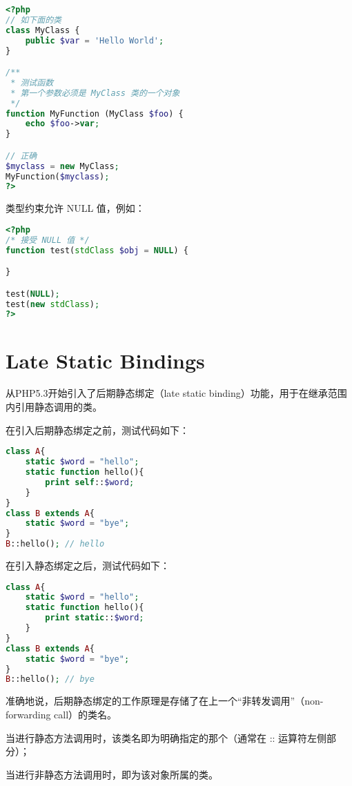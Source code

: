\begin{lstlisting}[language=PHP]
<?php
// 如下面的类
class MyClass {
    public $var = 'Hello World';
}

/**
 * 测试函数
 * 第一个参数必须是 MyClass 类的一个对象
 */
function MyFunction (MyClass $foo) {
    echo $foo->var;
}

// 正确
$myclass = new MyClass;
MyFunction($myclass);
?>
\end{lstlisting}

类型约束允许 NULL 值，例如：


\begin{lstlisting}[language=PHP]
<?php
/* 接受 NULL 值 */
function test(stdClass $obj = NULL) {

}

test(NULL);
test(new stdClass);
?>
\end{lstlisting}


\chapter{Late Static Bindings}


从PHP5.3开始引入了后期静态绑定（late static binding）功能，用于在继承范围内引用静态调用的类。

在引入后期静态绑定之前，测试代码如下：




\begin{lstlisting}[language=PHP]
class A{
	static $word = "hello";
	static function hello(){
		print self::$word;
	}
}
class B extends A{
	static $word = "bye"; 
}
B::hello(); // hello
\end{lstlisting}

在引入静态绑定之后，测试代码如下：


\begin{lstlisting}[language=PHP]
class A{
	static $word = "hello";
	static function hello(){
		print static::$word;
	}
}
class B extends A{
	static $word = "bye";
}
B::hello(); // bye
\end{lstlisting}


准确地说，后期静态绑定的工作原理是存储了在上一个“非转发调用”（non-forwarding call）的类名。

\begin{compactitem}
\item 当进行静态方法调用时，该类名即为明确指定的那个（通常在 :: 运算符左侧部分）；
\item 当进行非静态方法调用时，即为该对象所属的类。
\end{compactitem}


